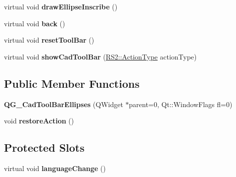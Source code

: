\begin{DoxyCompactItemize}
\item 
\hypertarget{classQG__CadToolBarEllipses_af49935018bbc2060ae71ab8467b0ccee}{virtual void {\bfseries draw\-Ellipse\-Inscribe} ()}\label{classQG__CadToolBarEllipses_af49935018bbc2060ae71ab8467b0ccee}

\item 
\hypertarget{classQG__CadToolBarEllipses_a86b1b400095edbf7aa4060508ab0d033}{virtual void {\bfseries back} ()}\label{classQG__CadToolBarEllipses_a86b1b400095edbf7aa4060508ab0d033}

\item 
\hypertarget{classQG__CadToolBarEllipses_a42b746674d216ee029210760bcd953c3}{virtual void {\bfseries reset\-Tool\-Bar} ()}\label{classQG__CadToolBarEllipses_a42b746674d216ee029210760bcd953c3}

\item 
\hypertarget{classQG__CadToolBarEllipses_ac293d99acbb40bfe3dd10665eb567496}{virtual void {\bfseries show\-Cad\-Tool\-Bar} (\hyperlink{classRS2_afe3523e0bc41fd637b892321cfc4b9d7}{R\-S2\-::\-Action\-Type} action\-Type)}\label{classQG__CadToolBarEllipses_ac293d99acbb40bfe3dd10665eb567496}

\end{DoxyCompactItemize}
\subsection*{Public Member Functions}
\begin{DoxyCompactItemize}
\item 
\hypertarget{classQG__CadToolBarEllipses_a054c3a0989787968120f7b98cfda0678}{{\bfseries Q\-G\-\_\-\-Cad\-Tool\-Bar\-Ellipses} (Q\-Widget $\ast$parent=0, Qt\-::\-Window\-Flags fl=0)}\label{classQG__CadToolBarEllipses_a054c3a0989787968120f7b98cfda0678}

\item 
\hypertarget{classQG__CadToolBarEllipses_abef750ccd2edceae34833ac9c05ded91}{void {\bfseries restore\-Action} ()}\label{classQG__CadToolBarEllipses_abef750ccd2edceae34833ac9c05ded91}

\end{DoxyCompactItemize}
\subsection*{Protected Slots}
\begin{DoxyCompactItemize}
\item 
\hypertarget{classQG__CadToolBarEllipses_ac8b4206a303c84256bcebb65d636c9f3}{virtual void {\bfseries language\-Change} ()}\label{classQG__CadToolBarEllipses_ac8b4206a303c84256bcebb65d636c9f3}

\end{DoxyCompactItemize}
